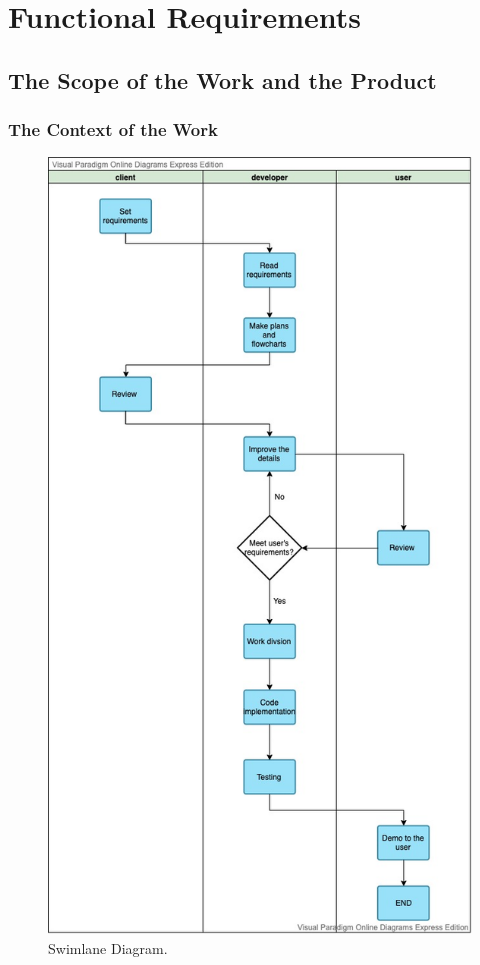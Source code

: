 \documentclass[12pt, titlepage]{article}
\begin{document}
\section{Functional Requirements}

\subsection{The Scope of the Work and the Product}
\subsubsection{The Context of the Work}
\newpage
\begin{figure}[H]
  \includegraphics[width=0.75\linewidth]{SL.jpg}
  \caption{Swimlane Diagram.}
  \label{fig:Swimlane Diagram}
\end{figure}
\end{document}
